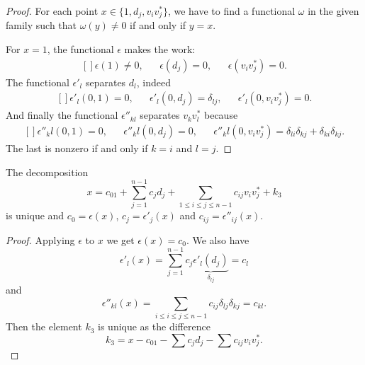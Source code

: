 \begin{proof}
    For each point $x\in\{ 1,d_j,v_iv_j^* \}$, we have to find a functional $\omega$ in the given family such that $\omega(y)\neq 0$ if and only if $y=x$.

    For $x=1$, the functional $\epsilon$ makes the work:
    \begin{equation}
        \begin{aligned}[]
            \epsilon(1)\neq 0,&&\epsilon(d_j)=0,&&\epsilon(v_iv_j^*)=0.
        \end{aligned}
    \end{equation}
    The functional $\epsilon'_l$ separates $d_l$, indeed
    \begin{equation}
        \begin{aligned}[]
            \epsilon'_l(0,1)=0,&&\epsilon'_l(0,d_j)=\delta_{lj},&&\epsilon'_l(0,v_iv_j^*)=0.
        \end{aligned}
    \end{equation}
    And finally the functional $\epsilon''_{kl}$ separates $v_kv_l^*$ because
    \begin{equation}
        \begin{aligned}[]
            \epsilon''_kl(0,1)=0,&&\epsilon''_kl(0,d_j)=0,&&\epsilon''_kl(0,v_iv_j^*)=\delta_{li}\delta_{kj}+\delta_{ki}\delta_{kj}.
        \end{aligned}
    \end{equation}
    The last is nonzero if and only if $k=i$ and $l=j$.
\end{proof}


\begin{proposition}     \label{PropDecompxczepsApp}
    The decomposition
    \begin{equation}
        x=c_01+\sum_{j=1}^{n-1}c_jd_j+\sum_{1\leq i\leq j\leq n-1}c_{ij}v_iv_j^*+k_3
    \end{equation}
    is unique and $c_0=\epsilon(x)$, $c_j=\epsilon'_j(x)$ and $c_{ij}=\epsilon''_{ij}(x)$.
\end{proposition}

\begin{proof}
    Applying $\epsilon$ to $x$ we get $\epsilon(x)=c_0$. We also have
    \begin{equation}
        \epsilon'_l(x)=\sum_{j=1}^{n-1}c_j\underbrace{\epsilon'_l(d_j)}_{\delta_{lj}}=c_l
    \end{equation}
    and 
    \begin{equation}
        \epsilon''_{kl}(x)=\sum_{i\leq i\leq j\leq n-1}c_{ij}\delta_{lj}\delta_{kj}=c_{kl}.
    \end{equation}
    Then the element $k_3$ is unique as the difference
    \begin{equation}
        k_3=x-c_01-\sum c_jd_j-\sum c_{ij}v_iv_j^*.
    \end{equation}
\end{proof}

